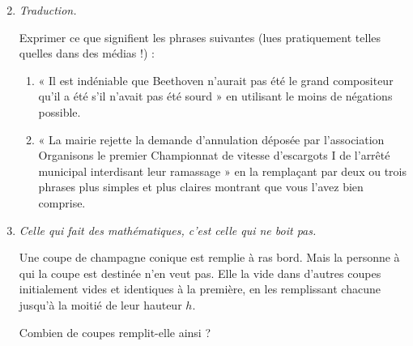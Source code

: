 \begin{enumerate}
\setcounter{enumi}{1}
\item \textit{Traduction.} 

Exprimer ce que signifient les phrases suivantes (lues pratiquement telles quelles dans des médias !) :

\begin{enumerate}
\item « Il est indéniable que Beethoven n’aurait pas été le grand compositeur qu’il a été s’il n’avait pas été sourd » en utilisant le moins de négations possible.

\item « La mairie rejette la demande d'annulation déposée par l'association Organisons le premier Championnat de vitesse d'escargots I de l'arrêté municipal interdisant leur ramassage » en la remplaçant par deux ou trois phrases plus simples et plus claires montrant que vous l'avez bien comprise.
\end{enumerate}

\item\textit{Celle qui fait des mathématiques, c'est celle qui ne boit pas.} 

Une coupe de champagne conique est remplie à ras bord. Mais la personne à qui la coupe est destinée n'en veut pas. Elle la vide dans d'autres coupes initialement vides et identiques à la première, en les remplissant chacune jusqu'à la moitié de leur hauteur $h$.

 Combien de coupes remplit-elle ainsi ?


\end{enumerate}

